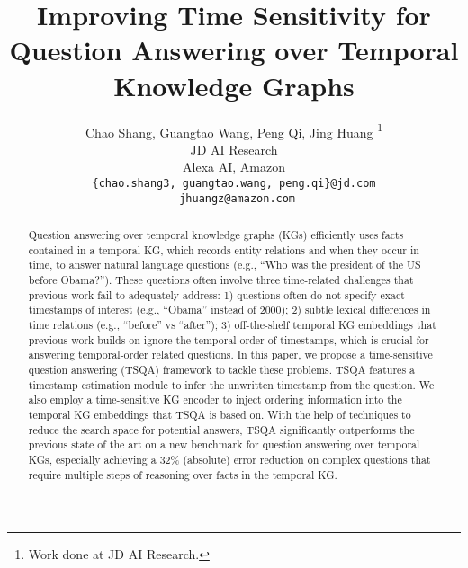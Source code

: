 \documentclass[11pt]{article}
\title{Improving Time Sensitivity for Question Answering over Temporal Knowledge Graphs}
\author{
Chao Shang\wg, Guangtao Wang\wg, Peng Qi\wg, 
Jing Huang\ws
\thanks{ \hspace{1mm} Work done at JD AI Research.} \\
  \wg JD AI Research\\
  \ws Alexa AI, Amazon\\
  \texttt{\{chao.shang3, guangtao.wang, peng.qi\}@jd.com} \\ \texttt{ jhuangz@amazon.com}\\}
\newcommand{\peng}[1]{{{\color{purple!60!blue}{[peng: #1]}}}}
\newcommand{\jing}[1]{{{\textcolor{red}{[jing: #1]}}}}
\begin{document}
\maketitle
\begin{abstract}

Question answering over temporal knowledge graphs (KGs) efficiently uses facts contained in a temporal KG, which records entity relations and when they occur in time, to answer natural language questions (e.g., ``Who was the president of the US before Obama?''). These questions often involve three time-related challenges that previous work fail to adequately address: 1) questions often do not specify exact timestamps of interest (e.g., ``Obama'' instead of 2000); 2) subtle lexical differences in time relations (e.g., ``before'' vs ``after''); 3) off-the-shelf temporal KG embeddings that previous work builds on ignore the temporal order of timestamps, which is crucial for answering temporal-order related questions. In this paper, we propose a time-sensitive question answering (TSQA) framework to tackle these problems. TSQA features a timestamp estimation module to infer the unwritten timestamp from the question. We also employ a time-sensitive KG encoder to inject ordering information into the temporal KG embeddings that TSQA is based on. With the help of techniques to reduce the search space for potential answers, TSQA significantly outperforms the previous state of the art on a new benchmark for question answering over temporal KGs, especially achieving a 32\% (absolute) error reduction on complex questions that require multiple steps of reasoning over facts in the temporal KG.



\end{abstract}
\end{document}

